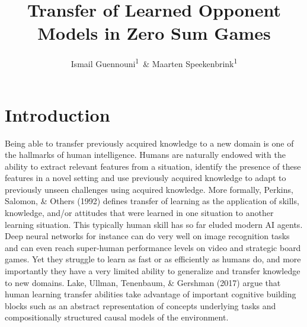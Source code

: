 \documentclass[man,floatsintext]{apa6}
\affiliation{
\vspace{0.5cm}
\textsuperscript{1} Department of Experimental Psychology, University College London}
\title{Transfer of Learned Opponent Models in Zero Sum Games}
\author{Ismail Guennouni\textsuperscript{1}~\& Maarten Speekenbrink\textsuperscript{1}}
\date{}
\begin{document}
\maketitle

\hypertarget{introduction}{%
\section{Introduction}\label{introduction}}

Being able to transfer previously acquired knowledge to a new domain is one of the hallmarks of human intelligence. Humans are naturally endowed with the ability to extract relevant features from a situation, identify the presence of these features in a novel setting and use previously acquired knowledge to adapt to previously unseen challenges using acquired knowledge. More formally, Perkins, Salomon, \& Others (1992) defines transfer of learning as the application of skills, knowledge, and/or attitudes that were learned in one situation to another learning situation. This typically human skill has so far eluded modern AI agents. Deep neural networks for instance can do very well on image recognition tasks and can even reach super-human performance levels on video and strategic board games. Yet they struggle to learn as fast or as efficiently as humans do, and more importantly they have a very limited ability to generalize and transfer knowledge to new domains. Lake, Ullman, Tenenbaum, \& Gershman (2017) argue that human learning transfer abilities take advantage of important cognitive building blocks such as an abstract representation of concepts underlying tasks and compositionally structured causal models of the environment.
\end{document}

